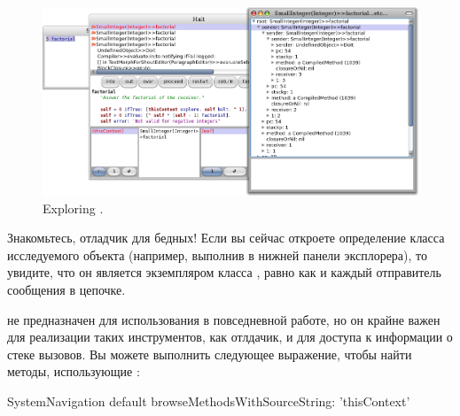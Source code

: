 \documentclass[a4paper,10pt,twoside]{book}
\begin{document}
{\begin{figure}[ht]\centering
	\includegraphics[width=\linewidth]{exploringThisContext}
	\caption{Exploring .}
\end{figure}

Знакомьтесь, отладчик для бедных!
Если вы сейчас откроете определение класса исследуемого объекта (например, выполнив  в нижней панели эксплорера), то увидите, что он является экземпляром класса , равно как и каждый отправитель сообщения в цепочке.

 не предназначен для использования в повседневной работе, но он крайне важен для реализации таких инструментов, как отлдачик, и для доступа к информации о стеке вызовов.
Вы можете выполнить следующее выражение, чтобы найти методы, использующие :

\begin{code}{}
SystemNavigation default browseMethodsWithSourceString: 'thisContext'
\end{code}

}
\end{document}

